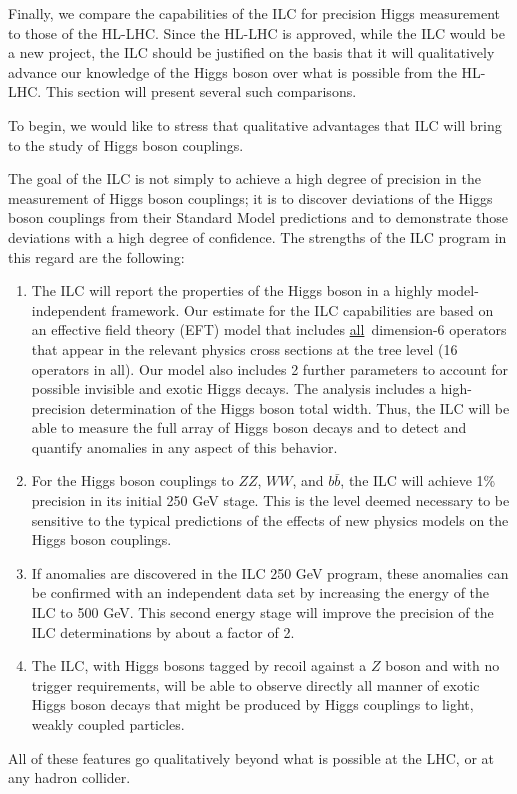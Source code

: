 


Finally, we compare the capabilities of the ILC for precision Higgs
measurement to those of the HL-LHC.  Since the HL-LHC is approved,
while the ILC would be a new project, the ILC should be justified on
the basis that it will qualitatively advance our knowledge of the Higgs
boson over what is possible from the HL-LHC.  
This section will present several such comparisons.

To begin, we would like to stress that qualitative advantages that ILC
will bring to the study of Higgs boson couplings.

The goal of the ILC is not simply to achieve a high degree of
precision in the measurement of Higgs boson couplings; it is to
discover deviations of the Higgs boson couplings from their Standard
Model predictions and to demonstrate those deviations with a high
degree of confidence.  The strengths of the ILC program in this regard
are the
 following:
\begin{enumerate}
\item The ILC will report the properties of the Higgs boson in a
  highly model-independent framework.   Our estimate for the ILC capabilities
  are based on an effective field theory (EFT) model that includes
 {\underline{all}}\ dimension-6 operators that appear in the relevant physics
  cross sections at the tree level  (16 operators in all).   Our model
  also includes 2 further parameters to account for possible invisible
  and exotic Higgs decays.    The analysis includes a
  high-precision determination of the Higgs boson total width. 
 Thus, the ILC will be able to measure  the full array of Higgs 
boson decays and to detect and quantify anomalies in any aspect of this behavior.
\item  For the Higgs boson couplings to $ZZ$, $WW$, and $b\bar b$, 
the ILC will achieve 1\% precision in its initial 250 GeV
  stage.   This is the
 level deemed necessary to be sensitive to the typical predictions 
of the effects of new physics models on the Higgs boson couplings.
\item  If  anomalies are  discovered in the ILC 
250 GeV program, these
  anomalies can be confirmed with an independent data set by
  increasing the energy of the ILC to 500 GeV.   This second energy
  stage will improve the precision of the ILC 
determinations by about a factor of 2.  
\item The ILC, with Higgs bosons tagged by recoil against a $Z$ boson
  and with no trigger requirements, will be able to observe directly
  all manner of exotic Higgs boson decays that might be produced by
Higgs couplings  to  light, weakly coupled  particles.
\end{enumerate}
All of these features go qualitatively beyond what is possible at the 
LHC, or at any hadron collider.

